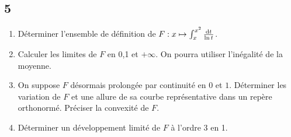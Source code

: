 \documentclass{article}[11pt]
\def \de {{\rm d}}
\begin{document}
  \subsection*{5}
  \begin{enumerate}
  \item Déterminer l'ensemble de définition de $F:x\mapsto \int_x^{x^2}\frac{\de t}{\ln t}$.
  \item Calculer les limites de $F$ en 0,1 et $+\infty$. On pourra utiliser l'inégalité de la moyenne.
  \item On suppose $F$ désormais prolongée par continuité en $0$ et $1$. Déterminer les variation de $F$ et une allure de sa courbe représentative dans un repère orthonormé. Préciser la convexité de $F$.
  \item Déterminer un développement limité de $F$ à l'ordre 3 en 1.
  \end{enumerate}
\end{document}
